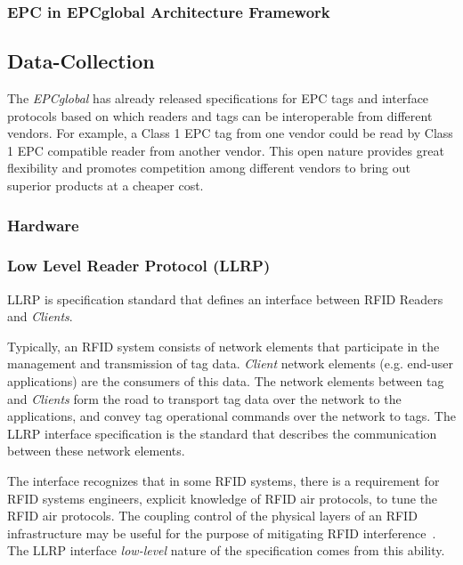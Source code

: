 
\subsubsection{EPC in EPCglobal Architecture Framework}



\subsection{Data-Collection}

The \emph{EPCglobal} has already released specifications for EPC tags and interface protocols based on which readers and tags can be interoperable from different vendors. For example, a Class 1 EPC tag from one vendor could be read by Class 1 EPC compatible reader from another vendor. This open nature provides great flexibility and promotes competition among different vendors to bring out superior products at a cheaper cost.  

\subsubsection{Hardware}

\subsubsection{Low Level Reader Protocol (LLRP)}

\gls{LLRP} is specification standard that defines an interface between \gls{RFID} Readers and \emph{Clients}.

Typically, an RFID system consists of network elements that participate in the management and transmission of tag data.
\emph{Client} network elements (e.g. end-user applications) are the consumers of this data.
The network elements between tag and \emph{Clients} form the road to transport tag data over the network to the applications, and convey tag operational commands over the network to tags.
The \gls{LLRP} interface specification is the standard that describes the communication between these network elements.


The interface recognizes that in some RFID systems, there is a requirement for RFID systems engineers, explicit knowledge of RFID air protocols, to tune the RFID air protocols. 
The coupling control of the physical layers of an RFID infrastructure may be useful for the purpose of mitigating RFID interference~\cite{Llrp1standard20101013Pdf}.
The \gls{LLRP} interface \emph{low-level} nature of the specification comes from this ability.


